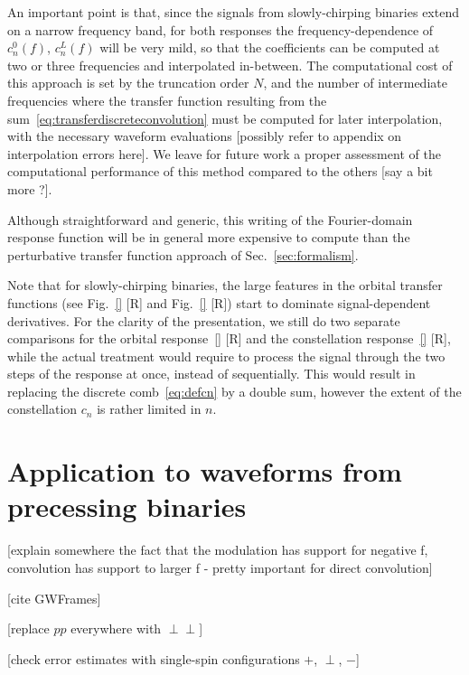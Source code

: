 \documentclass[aps,showpacs,twocolumn,
prd,superscriptaddress,nofootinbib]{revtex4-1}
\newcommand{\SM}[1]{{\color{Red} #1}}
\begin{document}
An important point is that, since the signals from slowly-chirping binaries extend on a narrow frequency band, for both responses the frequency-dependence of $c_{n}^{0}(f)$, $c_{n}^{L}(f)$ will be very mild, so that the coefficients can be computed at two or three frequencies and interpolated in-between. The computational cost of this approach is set by the truncation order $N$, and the number of intermediate frequencies where the transfer function resulting from the sum~\eqref{eq:transferdiscreteconvolution} must be computed for later interpolation, with the necessary waveform evaluations \SM{[possibly refer to appendix on interpolation errors here]}. We leave for future work a proper assessment of the computational performance of this method compared to the others \SM{[say a bit more ?]}. 

Although straightforward and generic, this writing of the Fourier-domain response function will be in general more expensive to compute than the perturbative transfer function approach of Sec.~\ref{sec:formalism}.

Note that for slowly-chirping binaries, the large features in the orbital transfer functions (see Fig.~\ref{} \SM{[R]} and Fig.~\ref{} \SM{[R]}) start to dominate signal-dependent derivatives. For the clarity of the presentation, we still do two separate comparisons for the orbital response~\eqref{} \SM{[R]} and the constellation response~\eqref{} \SM{[R]}, while the actual treatment would require to process the signal through the two steps of the response at once, instead of sequentially. This would result in replacing the discrete comb~\eqref{eq:defcn} by a double sum, however the extent of the constellation $c_{n}$ is rather limited in $n$.


\section{Application to waveforms from precessing binaries}
\label{sec:precession}

\SM{[explain somewhere the fact that the modulation has support for negative f, convolution has support to larger f - pretty important for direct convolution]}

\SM{[cite GWFrames]}

\SM{[replace $pp$ everywhere with $\perp\perp$]}

\SM{[check error estimates with single-spin configurations $+$, $\perp$, $-$]}
\end{document}
